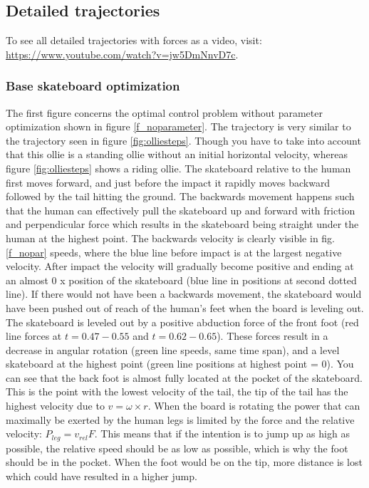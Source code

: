 \documentclass[default,iicol]{sn-jnl}
\begin{document}
{\begin{figure}
\end{figure}
\subsection{Detailed trajectories}
To see all detailed trajectories with forces as a video, visit: \url{https://www.youtube.com/watch?v=jw5DmNnvD7c}.

\subsubsection{Base skateboard optimization}

\noindent The first figure concerns the optimal control problem without parameter optimization shown in figure \ref{f_noparameter}. The trajectory is very similar to the trajectory seen in figure \ref{fig:olliesteps}. Though you have to take into account that this ollie is a standing ollie without an initial horizontal velocity, whereas figure \ref{fig:olliesteps} shows a riding ollie. The skateboard relative to the human first moves forward, and just before the impact it rapidly moves backward followed by the tail hitting the ground. The backwards movement happens such that the human can effectively pull the skateboard up and forward with friction and perpendicular force which results in the skateboard being straight under the human at the highest point. The backwards velocity is clearly visible in fig. \ref{f_nopar} speeds, where the blue line before impact is at the largest negative velocity. After impact the velocity will gradually become positive and ending at an almost 0 x position of the skateboard (blue line in positions at second dotted line). If there would not have been a backwards movement, the skateboard would have been pushed out of reach of the human's feet when the board is leveling out. The skateboard is leveled out by a positive abduction force of the front foot (red line forces at $t=0.47-0.55$ and $t=0.62-0.65$). These forces result in a decrease in angular rotation (green line speeds, same time span), and a level skateboard at the highest point (green line positions at highest point = 0).
You can see that the back foot is almost fully located at the pocket of the skateboard. This is the point with the lowest velocity of the tail, the tip of the tail has the highest velocity due to $v = \omega \times r$. When the board is rotating the power that can maximally be exerted by the human legs is limited by the force and the relative velocity: $P_{leg} = v_{rel} F$. This means that if the intention is to jump up as high as possible, the relative speed should be as low as possible, which is why the foot should be in the pocket. When the foot would be on the tip, more distance is lost which could have resulted in a higher jump. 
}
\end{document}
